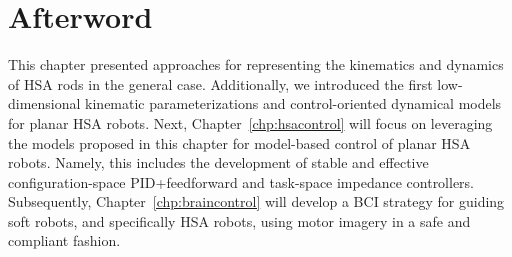 \section{Afterword}
This chapter presented approaches for representing the kinematics and dynamics of \gls{HSA} rods in the general case. Additionally, we introduced the first low-dimensional kinematic parameterizations and control-oriented dynamical models for planar \gls{HSA} robots.
Next, Chapter~\ref{chp:hsacontrol} will focus on leveraging the models proposed in this chapter for model-based control of planar \gls{HSA} robots.
Namely, this includes the development of stable and effective configuration-space PID+feedforward and task-space impedance controllers.
Subsequently, Chapter~\ref{chp:braincontrol} will develop a \gls{BCI} strategy for guiding soft robots, and specifically \gls{HSA} robots, using motor imagery in a safe and compliant fashion.